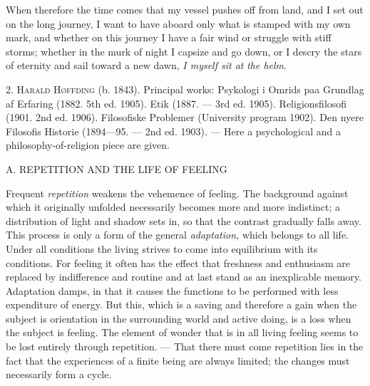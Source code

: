 \documentclass[12pt,a4paper,openany]{book}
\newcommand{\opage}[1]{\marginnote{\footnotesize\textit{[#1]}}}
\newcommand{\excerpthead}[1]{\par\bigskip\begin{center}#1\end{center}\nopagebreak\smallskip}
\newenvironment{intro}{\par}{\par}
\begin{document}
When therefore the time comes that my vessel pushes off from land, and I set out on the
long journey, I want to have aboard only what is stamped with my own mark, and whether on
this journey I have a fair wind or struggle with stiff storms; whether in the murk of
night I capsize and go down, or I descry the stars of eternity and sail toward a new
dawn, \emph{I myself sit at}
\emph{the helm}.

\setcounter{footnote}{0}%
\opage{231}
\begin{intro}

2. \textsc{Harald Høffding} (b. 1843). Principal works: Psykologi i
Omrids paa Grundlag af Erfaring (1882. 5th ed. 1905). Etik
(1887. --- 3rd ed. 1905). Religionsfilosofi (1901. 2nd ed. 1906).
Filosofiske Problemer (University program 1902). Den nyere Filosofis
Historie (1894---95. --- 2nd ed. 1903). --- Here a psychological and a
philosophy-of-religion piece are given.
\end{intro}

\excerpthead{A. REPETITION AND THE LIFE OF FEELING}


Frequent \textit{repetition} weakens the vehemence of feeling. The background against
which it originally unfolded necessarily becomes more and more indistinct; a distribution
of light and shadow sets in, so that the contrast gradually falls away. This process is
only a form of the general \textit{adaptation,} which belongs to all life. Under all
conditions the living strives to come into equilibrium with its conditions. For feeling it
often has the effect that freshness and enthusiasm are replaced by indifference and
routine and at last stand as an inexplicable memory. Adaptation damps, in that it causes
the functions to be performed with less expenditure of energy. But this, which is a
saving and therefore a gain when the subject is orientation in the surrounding world and
active doing, is a loss when the subject is feeling. The element of wonder that is in all
living feeling seems to be lost entirely through repetition. --- That there must come
repetition lies in the fact that the experiences of a finite being are always limited; the
changes must necessarily form a cycle.
\end{document}
